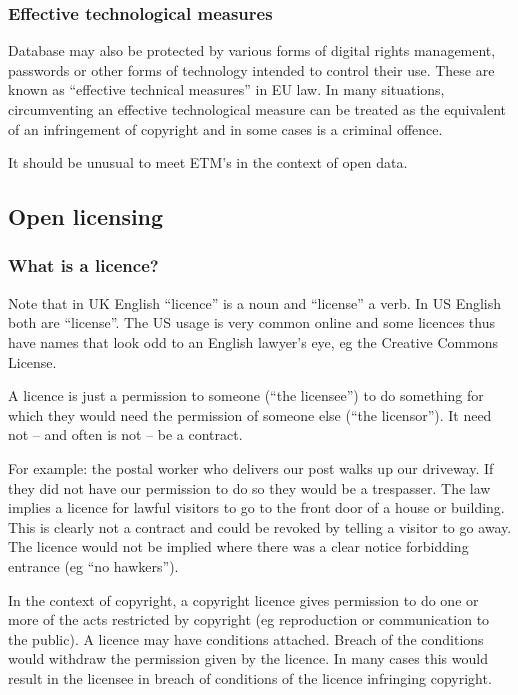 \subsubsection{Effective technological
measures}\label{effective-technological-measures}

Database may also be protected by various forms of digital rights
management, passwords or other forms of technology intended to control
their use. These are known as ``effective technical measures'' in EU
law. In many situations, circumventing an effective technological
measure can be treated as the equivalent of an infringement of copyright
and in some cases is a criminal offence.

It should be unusual to meet ETM's in the context of open data.

\subsection{Open licensing}\label{open-licensing}

\subsubsection{What is a licence?}\label{what-is-a-licence}

Note that in UK English ``licence'' is a noun and ``license'' a verb. In
US English both are ``license''. The US usage is very common online and
some licences thus have names that look odd to an English lawyer's eye,
eg the Creative Commons License.

A licence is just a permission to someone (``the licensee'') to do
something for which they would need the permission of someone else
(``the licensor''). It need not -- and often is not -- be a contract.

For example: the postal worker who delivers our post walks up our
driveway. If they did not have our permission to do so they would be a
trespasser. The law implies a licence for lawful visitors to go to the
front door of a house or building. This is clearly not a contract and
could be revoked by telling a visitor to go away. The licence would not
be implied where there was a clear notice forbidding entrance (eg ``no
hawkers'').

In the context of copyright, a copyright licence gives permission to do
one or more of the acts restricted by copyright (eg reproduction or
communication to the public). A licence may have conditions attached.
Breach of the conditions would withdraw the permission given by the
licence. In many cases this would result in the licensee in breach of
conditions of the licence infringing copyright.

